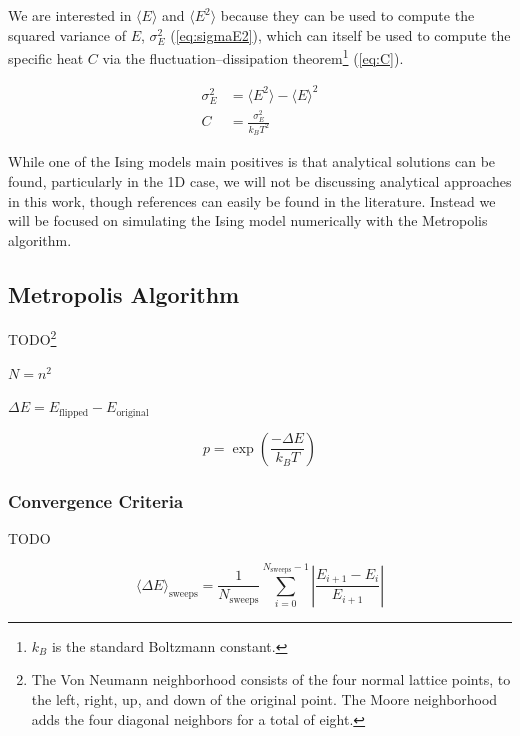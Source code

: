 \documentclass[notitlepage,aps,prd,nofootinbib]{revtex4-1}
\begin{document}
We are interested in $\langle E \rangle$ and $\langle E^{2} \rangle$ because they can be used to compute the squared variance of $E$, $\sigma_{E}^{2}$ (\ref{eq:sigmaE2}), which can itself be used to compute the specific heat $C$ via the fluctuation--dissipation theorem\footnote{$k_{B}$ is the standard Boltzmann constant.} (\ref{eq:C}).

\begin{align}
\sigma_{E}^{2} &=  \langle E^{2} \rangle - \langle E \rangle^{2} \label{eq:sigmaE2} \\
C &= \frac{\sigma_{E}^{2}}{k_{B} T^{2}} \label{eq:C}
\end{align}


While one of the Ising models main positives is that analytical solutions can be found, particularly in the 1D case, we will not be discussing analytical approaches in this work, though references can easily be found in the literature. Instead we will be focused on simulating the Ising model numerically with the Metropolis algorithm.

\subsection{Metropolis Algorithm}
\label{subsec:met_alg}
TODO\footnote{The Von Neumann neighborhood consists of the four normal lattice points, to the left, right, up, and down of the original point. The Moore neighborhood adds the four diagonal neighbors for a total of eight.}

$N=n^{2}$

$\Delta E = E_{\mathrm{flipped}} - E_{\mathrm{original}}$


\begin{equation}
\label{eq:p}
p = \exp\left(\frac{-\Delta E}{k_{B} T}\right)
\end{equation}



\subsubsection{Convergence Criteria}
\label{subsubsec:convergence}
TODO


\begin{equation}
\label{eq:histE}
\langle \Delta E \rangle_{\mathrm{sweeps}} = \frac{1}{N_{\mathrm{sweeps}}} \sum_{i=0}^{N_{\mathrm{sweeps}}-1} \left|\frac{ E_{i+1} - E_{i}}{E_{i+1}}\right|
\end{equation}
\end{document}
